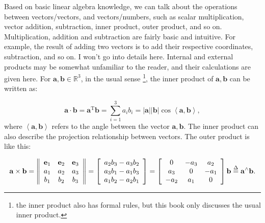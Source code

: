 Based on basic linear algebra knowledge, we can talk about the operations between vectors/vectors, and vectors/numbers, such as scalar multiplication, vector addition, subtraction, inner product, outer product, and so on. Multiplication, addition and subtraction are fairly basic and intuitive. For example, the result of adding two vectors is to add their respective coordinates, subtraction, and so on. I won't go into details here. Internal and external products may be somewhat unfamiliar to the reader, and their calculations are given here. For $ \mathbf {a}, \mathbf {b} \in  \mathbb {R}^ 3 $, in the usual sense \footnote {the inner product also has formal rules, but this book only discusses the usual inner product.}, the inner product of $\mathbf{a}, \mathbf{b}$ can be written as:

\begin{equation}
\mathbf{a} \cdot \mathbf{b} = { \mathbf{a}^\mathrm{T}}\mathbf{b} = \sum\limits_{i = 1}^3 {{a_i}{b_i}}  = \left| \mathbf{a} \right|\left| \mathbf{b} \right|\cos \left\langle {\mathbf{a},\mathbf{b}} \right\rangle ,
\end{equation}
where $ \left \langle { \mathbf {a}, \mathbf {b}} \right \rangle $ refers to the angle between the vector $ \mathbf {a}, \mathbf {b} $. The inner product can also describe the projection relationship between vectors. The outer product is like this:

\begin{equation}
\label{eq:cross}
\mathbf{a} \times \mathbf{b} = \left\| {\begin{array}{*{20}{c}}
	\mathbf{e}_1 & \mathbf{e}_2 & \mathbf{e}_3 \\
	{{a_1}}&{{a_2}}&{{a_3}}\\
	{{b_1}}&{{b_2}}&{{b_3}}
	\end{array}} \right\| = \left[ \begin{array}{l}
{a_2}{b_3} - {a_3}{b_2}\\
{a_3}{b_1} - {a_1}{b_3}\\
{a_1}{b_2} - {a_2}{b_1}
\end{array} \right] = \left[ {\begin{array}{*{20}{c}}
	0&{ - {a_3}}&{{a_2}}\\
	{{a_3}}&0&{-{a_1}}\\  
	{-{a_2}}&{{a_1}}&0  
	\end{array}} \right] \mathbf{b} \buildrel \Delta \over = { \mathbf{a}^ \wedge } \mathbf{b}.
\end{equation}

